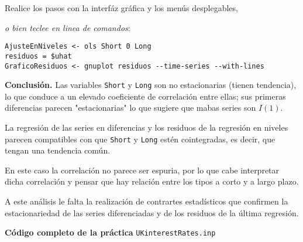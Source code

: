 \documentclass[11pt]{article}
\begin{document}
Realice los pasos con la interfáz gráfica y los menús desplegables,
{\vspace{0pt} \footnotesize \color{gray!70!black}
\emph{o bien teclee en linea de comandos}:
\begin{verbatim}
AjusteEnNiveles <- ols Short 0 Long
residuos = $uhat
GraficoResiduos <- gnuplot residuos --time-series --with-lines
\end{verbatim}
}


\textbf{Conclusión.} Las variables \texttt{Short} y \texttt{Long} son no estacionarias
(tienen tendencia), lo que conduce a un elevado coeficiente de
correlación entre ellas; sus primeras diferencias parecen
"estacionarias" lo que sugiere que mabas series son \(I(1)\).

La regresión de las series en diferencias y los residuos de la
regresión en niveles parecen compatibles con que \texttt{Short} y \texttt{Long}
estén cointegradas, es decir, que tengan una tendencia común.

En este caso la correlación no parece ser espuria, por lo que cabe
interpretar dicha correlación y pensar que hay relación entre los
tipos a corto y a largo plazo.

A este análisis le falta la realización de contrartes estadísticos que
confirmen la estacionariedad de las series diferenciadas y de los
residuos de la última regresión.

\vspace{10pt}
\noindent
\textbf{Código completo de la práctica} \texttt{UKinterestRates.inp}
\vspace{10pt}

\clearpage
\end{document}
